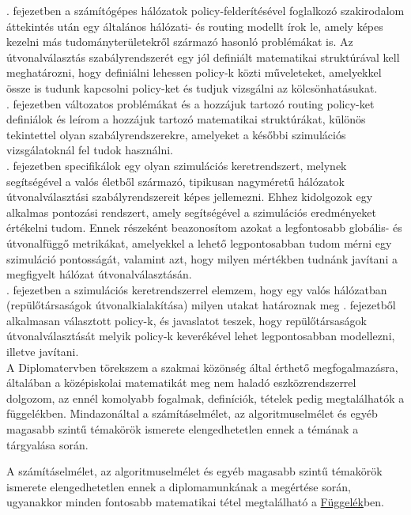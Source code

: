 . fejezetben a számítógépes hálózatok policy-felderítésével foglalkozó szakirodalom áttekintés után egy általános hálózati- és routing modellt írok le, amely képes kezelni más tudományterületekről származó hasonló problémákat is. Az útvonalválasztás szabályrendszerét egy jól definiált matematikai struktúrával kell meghatározni, hogy definiálni lehessen policy-k közti műveleteket, amelyekkel össze is tudunk kapcsolni policy-ket és tudjuk vizsgálni az kölcsönhatásukat.\\

. fejezetben változatos problémákat és a hozzájuk tartozó routing policy-ket definiálok és leírom a hozzájuk tartozó matematikai struktúrákat, különös tekintettel olyan szabályrendszerekre, amelyeket a későbbi szimulációs vizsgálatoknál fel tudok használni.\\

. fejezetben specifikálok egy olyan szimulációs keretrendszert, melynek segítségével a valós életből származó, tipikusan nagyméretű hálózatok útvonalválasztási szabályrendszereit képes jellemezni. Ehhez kidolgozok egy alkalmas pontozási rendszert, amely segítségével a szimulációs eredményeket értékelni tudom. Ennek részeként beazonosítom azokat a legfontosabb globális- és útvonalfüggő metrikákat, amelyekkel a lehető legpontosabban tudom mérni egy szimuláció pontosságát, valamint azt, hogy milyen mértékben tudnánk javítani a megfigyelt hálózat útvonalválasztásán.\\

. fejezetben a szimulációs keretrendszerrel elemzem, hogy egy valós hálózatban (repülőtársaságok útvonalkialakítása) milyen utakat határoznak meg . fejezetből alkalmasan választott policy-k, és javaslatot teszek, hogy repülőtársaságok útvonalválasztását melyik policy-k keverékével lehet legpontosabban modellezni, illetve javítani.\\


A Diplomatervben törekszem a szakmai közönség által érthető megfogalmazásra, általában a középiskolai matematikát meg nem haladó eszközrendszerrel dolgozom, az ennél komolyabb fogalmak, definíciók, tételek pedig megtalálhatók a függelékben. Mindazonáltal a számításelmélet, az algoritmuselmélet és egyéb magasabb szintű témakörök ismerete elengedhetetlen ennek a témának a tárgyalása során.

A számításelmélet, az algoritmuselmélet és egyéb magasabb szintű témakörök ismerete elengedhetetlen ennek a diplomamunkának a megértése során, ugyanakkor minden fontosabb matematikai tétel megtalálható a \hyperlink{appendix}{Függelék}ben.
